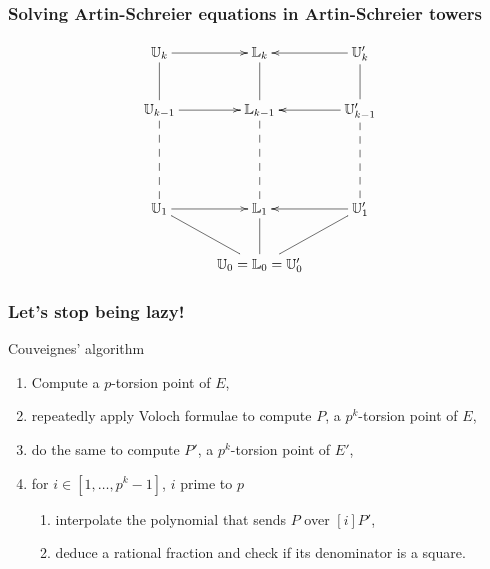 \documentclass[10pt]{beamer}
\newcommand{\LK}{\mathbb{L}}  %
\newcommand{\U}{\mathbb{U}}  %
\newcommand{\0}{\mathcal{O}}  %
\begin{document}

\begin{frame}
  \frametitle{Solving Artin-Schreier equations in Artin-Schreier towers}

  \Large\[\xymatrix{
    \U_k \ar@{-}[d]\ar[r]      & \LK_k \ar@{-}[d]      & \U_k' \ar@{-}[d]\ar[l]\\
    \U_{k-1} \ar@{--}[dd]\ar[r] & \LK_{k-1} \ar@{--}[dd] & \U_{k-1}' \ar@{--}[dd]\ar[l]\\
    \\
    \U_1 \ar@{-}[dr]\ar[r]     & \LK_1 \ar@{-}[d]      & \U_1' \ar@{-}[dl]\ar[l]\\
                         &\U_0=\LK_0=\U_0'
  }\]
\end{frame}


\begin{frame}
  \frametitle{Let's stop being lazy!}

  \vspace{-1mm}

  \begin{block}{Couveignes' algorithm}
    \begin{enumerate}
    \item Compute a $p$-torsion point of $E$,
    \item repeatedly apply Voloch formulae to compute $P$, a $p^k$-torsion
      point of $E$,
    \item do the same to compute $P'$, a $p^k$-torsion point
      of $E'$,
    \item for $i \in [1,\dots,p^k-1]$, $i$ prime to $p$
      \begin{enumerate}
      \item interpolate the polynomial that sends $P$ over $[i]P'$,
      \item deduce a rational fraction and check if its denominator is
        a square.
      \end{enumerate}
    \end{enumerate}
  \end{block}

  \vspace{-1mm}


\end{frame}
\end{document}
